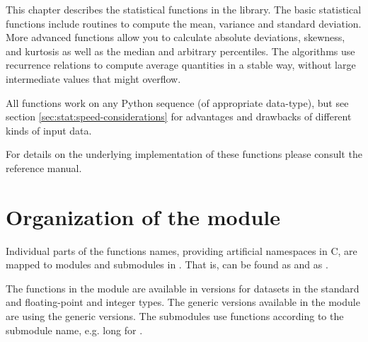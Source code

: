 

This chapter describes the statistical functions in the library.  The basic
statistical functions include routines to compute the mean, variance and
standard deviation. More advanced functions allow you to calculate absolute
deviations, skewness, and kurtosis as well as the median and arbitrary
percentiles.  The algorithms use recurrence relations to compute average
quantities in a stable way, without large intermediate values that might
overflow.

All functions work on any Python sequence (of appropriate data-type), but see
section \ref{sec:stat:speed-considerations} for advantages and drawbacks of
different kinds of input data.

\begin{seealso}
   For details on the underlying implementation of these functions please
   consult the \GSL{} reference manual.
\end{seealso}



\section{Organization of the module}
\label{sec:stat:organization}

Individual parts of the \gsl{} functions names, providing artificial namespaces
in C, are mapped to modules and submodules in \pygsl{}.  That is,
 can be found as  and
 as .

The functions in the module are available in versions for datasets in the
standard and \numpy{} floating-point and integer types. The generic versions
available in the  module are using the generic \gsl{}
 versions.  The submodules use \gsl{} functions according to the
submodule name, e.g. long for .


